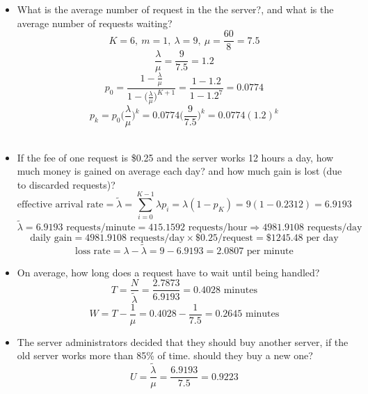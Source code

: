 \documentclass[10.5pt,letterpaper]{article}
\begin{document}
\begin{enumerate}[label=\textbf{Problem \arabic*.}]
\begin{itemize}
		\item What is the average number of request in the the server?, and what is the average number of requests waiting?
		\[K = 6,\ m = 1,\ \lambda = 9,\ \mu = \frac{60}{8} = 7.5\]
		\[\frac{\lambda}{\mu} = \frac{9}{7.5} = 1.2\]
		\[p_0 = \frac{1-\frac{\lambda}{\mu}}{1-\bigg(\frac{\lambda}{\mu}\bigg)^{K+1}} = \frac{1-1.2}{1-1.2^7} = 0.0774\]
		\[p_k = p_0\bigg(\frac{\lambda}{\mu}\bigg)^k=0.0774\bigg(\frac{9}{7.5}\bigg)^k = 0.0774(1.2)^k\]\\
		\fbox{\parbox{\textwidth}{\[N = \sum_{i=1}^{K}ip_i = 3.7098 \text{ requests}\]
		\[N_q = \sum_{i=m+1}^{K}(i-m)p_i = \sum_{i=2}^{K}(i-1)p_i = 2.7873 \text{ requests}\]}}
		\item If the fee of one request is \$0.25 and the server works 12 hours a day, how much money is gained on average each day? and how much gain is lost (due to discarded requests)?
		\[\text{effective arrival rate}=\widetilde{\lambda} = \sum_{i=0}^{K-1}\lambda p_i = \lambda(1-p_K) = 9(1-0.2312) = 6.9193\]
		\[\widetilde{\lambda} = 6.9193 \text{ requests/minute} = 415.1592 \text{ requests/hour} \Rightarrow 4981.9108 \text{ requests/day}\]
		\[\boxed{\text{daily gain} = 4981.9108 \text{ requests/day} \times \$0.25 \text{/request} = \$1245.48 \text{ per day}}\]
		\[\text{loss rate} = \lambda - \widetilde{\lambda} = 9 - 6.9193 = 2.0807 \text{ per minute}\]
		\item On average, how long does a request have to wait until being handled?
		\[T = \frac{N}{\widetilde{\lambda}} = \frac{2.7873}{6.9193} = 0.4028 \text{ minutes}\]
		\[\boxed{W = T - \frac{1}{\mu} = 0.4028 - \frac{1}{7.5} = 0.2645 \text{ minutes}}\]
		\item The server administrators decided that they should buy another server, if the old server works more than 85\% of time. should they buy a new one?
		\[U = \frac{\widetilde{\lambda}}{\mu} = \frac{6.9193}{7.5} = 0.9223\]

\end{itemize}
\end{enumerate}
\end{document}
